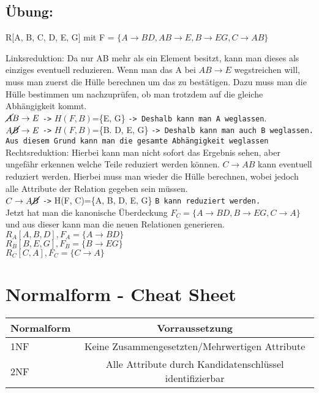 \documentclass{article}
\begin{document}
	\subsection{Übung:}
	R[A, B, C, D, E, G] mit F = $\{A\to BD, AB\to E, B\to EG, C\to AB\}$

	Linksreduktion: Da nur AB mehr als ein Element besitzt, kann man dieses als einziges eventuell reduzieren.
	Wenn man das A bei $AB\to E$ wegstreichen will, muss man zuerst die Hülle berechnen um das zu bestätigen. Dazu muss man die Hülle bestimmen um nachzuprüfen, ob man trotzdem auf die gleiche Abhängigkeit kommt. \\
	$\cancel{A}B\to E$ \texttt{->} $H(F, B)$=\{E, G\} \texttt{-> Deshalb kann man A weglassen}.\\
	$A\cancel{B}\to E$ \texttt{->} $H(F, B)$=\{B. D, E, G\} \texttt{-> Deshalb kann man auch B weglassen. Aus diesem Grund kann man die gesamte Abhängigkeit weglassen}\\
	Rechtsreduktion: Hierbei kann man nicht sofort das Ergebnis sehen, aber ungefähr erkennen welche Teile reduziert werden können. $C\to AB$ kann eventuell reduziert werden. Hierbei muss man wieder die Hülle berechnen, wobei jedoch alle Attribute der Relation gegeben sein müssen. \\
	$C\to A\cancel{B}$ \texttt{->} H(F, C)=\{A, B, D, E, G\} \texttt{B kann reduziert werden.} \\
	Jetzt hat man die kanonische Überdeckung $F_C=\{A\to BD, B\to EG, C\to A\}$ und aus dieser kann man die neuen Relationen generieren.
	$R_A[A, B, D], F_A=\{A\to BD\}$ \\
	$R_B[B, E, G], F_B=\{B\to EG\}$ \\
	$R_C[C, A], F_C=\{C\to A\}$ \\
	\section{Normalform - Cheat Sheet}
	\begin{tabular}{| l | c |}
		\toprule
		Normalform & Vorraussetzung \\ \midrule
		1NF & Keine Zusammengesetzten/Mehrwertigen Attribute \\ \hline
		2NF & Alle Attribute durch Kandidatenschlüssel identifizierbar \\ \hline
		
		\bottomrule
	\end{tabular}
\end{document}
